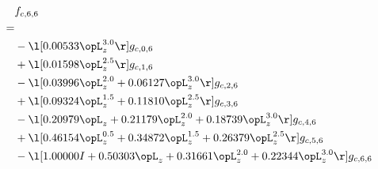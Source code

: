 \begin{alignat}{2} 
\label{eq:f_66_0} 
& f_{c,6,6} \nonumber \\ 
 = \\ 
& - \l[  0.00533 \opL_z^{3.0}  \r] g_{c,0,6} \nonumber \\ 
& + \l[  0.01598 \opL_z^{2.5}  \r] g_{c,1,6} \nonumber \\ 
& - \l[  0.03996 \opL_z^{2.0} +  0.06127 \opL_z^{3.0}  \r] g_{c,2,6} \nonumber \\ 
& + \l[  0.09324 \opL_z^{1.5} +  0.11810 \opL_z^{2.5}  \r] g_{c,3,6} \nonumber \\ 
& - \l[  0.20979 \opL_z +  0.21179 \opL_z^{2.0} +  0.18739 \opL_z^{3.0}  \r] g_{c,4,6} \nonumber \\ 
& + \l[  0.46154 \opL_z^{0.5} +  0.34872 \opL_z^{1.5} +  0.26379 \opL_z^{2.5}  \r] g_{c,5,6} \nonumber \\ 
& - \l[  1.00000 I +  0.50303 \opL_z +  0.31661 \opL_z^{2.0} +  0.22344 \opL_z^{3.0}  \r] g_{c,6,6} \nonumber \\ 
\end{alignat} 


